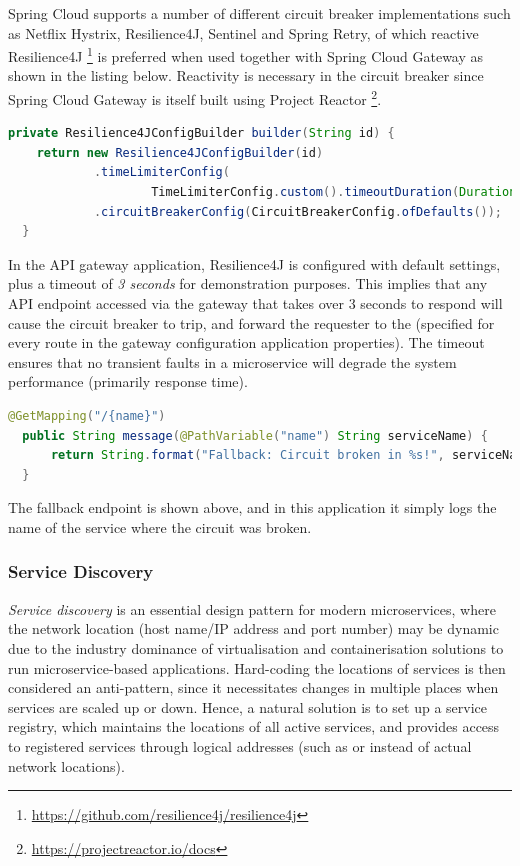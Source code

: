 Spring Cloud supports a number of different circuit breaker implementations such as Netflix Hystrix, Resilience4J, Sentinel and Spring Retry, of which reactive Resilience4J \footnote{\url{https://github.com/resilience4j/resilience4j}} is preferred when used together with Spring Cloud Gateway as shown in the listing below. Reactivity is necessary in the circuit breaker since Spring Cloud Gateway is itself built using Project Reactor \footnote{\url{https://projectreactor.io/docs}}.

\begin{lstlisting}[language=Java, caption=Circuit breaker configuration in API gateway application]
  private Resilience4JConfigBuilder builder(String id) {
    return new Resilience4JConfigBuilder(id)
            .timeLimiterConfig(
                    TimeLimiterConfig.custom().timeoutDuration(Duration.ofSeconds(3)).build())
            .circuitBreakerConfig(CircuitBreakerConfig.ofDefaults());
  }
\end{lstlisting}

In the API gateway application, Resilience4J is configured with default settings, plus a timeout of \textit{3 seconds} for demonstration purposes. This implies that any API endpoint accessed via the gateway that takes over 3 seconds to respond will cause the circuit breaker to trip, and forward the requester to the (specified for every route in the gateway configuration application properties). The timeout ensures that no transient faults in a microservice will degrade the system performance (primarily response time).

\begin{lstlisting}[language=Java, caption=Code snippet from \code{FallbackController.java}]
  @GetMapping("/{name}")
  public String message(@PathVariable("name") String serviceName) {
      return String.format("Fallback: Circuit broken in %s!", serviceName);
  }
\end{lstlisting}

The fallback endpoint is shown above, and in this application it simply logs the name of the service where the circuit was broken.

\subsubsection{Service Discovery}

\textit{Service discovery} is an essential design pattern for modern microservices, where the network location (host name/IP address and port number) may be dynamic due to the industry dominance of virtualisation and containerisation solutions to run microservice-based applications. Hard-coding the locations of services is then considered an anti-pattern, since it necessitates changes in multiple places when services are scaled up or down. Hence, a natural solution is to set up a service registry, which maintains the locations of all active services, and provides access to registered services through logical addresses (such as  or  instead of actual network locations).

